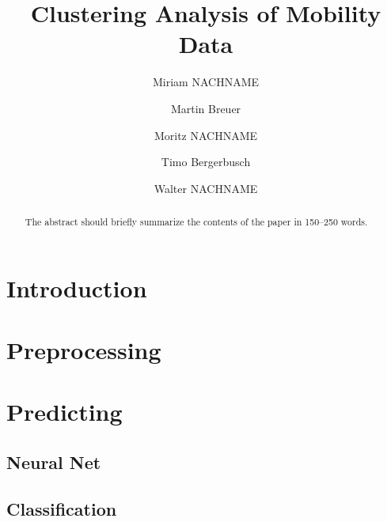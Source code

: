 \documentclass[runningheads]{llncs}
\begin{document}
	\title{Clustering Analysis of Mobility Data}
	\author{Miriam NACHNAME\and
		Martin Breuer\and
		Moritz NACHNAME\and
		Timo Bergerbusch\and
		Walter NACHNAME}
	\maketitle              %
	\begin{abstract} %
		The abstract should briefly summarize the contents of the paper in
		150--250 words.
		
	\end{abstract}
	\section{Introduction}
	\section{Preprocessing}
	\section{Predicting}
	\subsection{Neural Net}
	\subsection{Classification}
	
\end{document}

